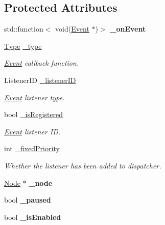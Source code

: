 \subsection*{Protected Attributes}
\begin{DoxyCompactItemize}
\item 
\mbox{\label{classEventListener_a663118ecf2f481a42c6cff9a31c97b70}} 
std\+::function$<$ void(\hyperlink{classEvent}{Event} $\ast$)$>$ {\bfseries \+\_\+on\+Event}
\item 
\mbox{\label{classEventListener_a6c42e40e14d6707476f7789299a3713d}} 
\hyperlink{classEventListener_ab78e6acdfa2343490eda9e92d1555ee4}{Type} \hyperlink{classEventListener_a6c42e40e14d6707476f7789299a3713d}{\+\_\+type}
\begin{DoxyCompactList}\small\item\em \hyperlink{classEvent}{Event} callback function. \end{DoxyCompactList}\item 
\mbox{\label{classEventListener_a0ef8f47bd7e062da36ccb5d5d7a2d0a5}} 
Listener\+ID \hyperlink{classEventListener_a0ef8f47bd7e062da36ccb5d5d7a2d0a5}{\+\_\+listener\+ID}
\begin{DoxyCompactList}\small\item\em \hyperlink{classEvent}{Event} listener type. \end{DoxyCompactList}\item 
\mbox{\label{classEventListener_a54e63c9ca039f2e759e47347f25f9faa}} 
bool \hyperlink{classEventListener_a54e63c9ca039f2e759e47347f25f9faa}{\+\_\+is\+Registered}
\begin{DoxyCompactList}\small\item\em \hyperlink{classEvent}{Event} listener ID. \end{DoxyCompactList}\item 
\mbox{\label{classEventListener_a4d8ad2934ba760937e1182421bcf4854}} 
int \hyperlink{classEventListener_a4d8ad2934ba760937e1182421bcf4854}{\+\_\+fixed\+Priority}
\begin{DoxyCompactList}\small\item\em Whether the listener has been added to dispatcher. \end{DoxyCompactList}\item 
\mbox{\label{classEventListener_aa58d1ee1c02c030bd578f53b39d087e8}} 
\hyperlink{classNode}{Node} $\ast$ {\bfseries \+\_\+node}
\item 
\mbox{\label{classEventListener_adf79c3b1b9788f5eb0b9b8c1ec608642}} 
bool {\bfseries \+\_\+paused}
\item 
\mbox{\label{classEventListener_adfb141a7f91aba76857f4f464d24e88c}} 
bool {\bfseries \+\_\+is\+Enabled}
\end{DoxyCompactItemize}
